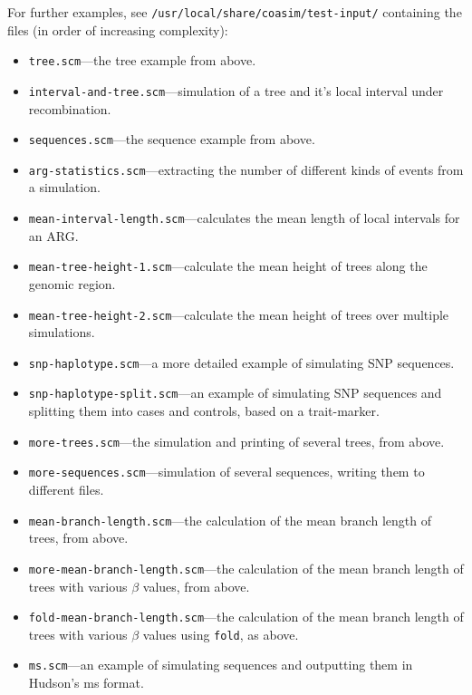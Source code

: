 \documentclass{manual}
\begin{document}
For further examples, see \verb?/usr/local/share/coasim/test-input/?
containing the files (in order of increasing complexity):
\begin{itemize}
\item \texttt{tree.scm}---the tree example from above.
\item \texttt{interval-and-tree.scm}---simulation of a tree and it's
  local interval under recombination.
\item \texttt{sequences.scm}---the sequence example from above.
\item \texttt{arg-statistics.scm}---extracting the number of different
  kinds of events from a simulation.
\item \texttt{mean-interval-length.scm}---calculates the mean length
  of local intervals for an ARG.
\item \texttt{mean-tree-height-1.scm}---calculate the mean height of
  trees along the genomic region.
\item \texttt{mean-tree-height-2.scm}---calculate the mean height of
  trees over multiple simulations.
\item \texttt{snp-haplotype.scm}---a more detailed example of
  simulating SNP sequences.
\item \texttt{snp-haplotype-split.scm}---an example of
  simulating SNP sequences and splitting them into cases and controls,
  based on a trait-marker.
\item \texttt{more-trees.scm}---the simulation and printing of several
  trees, from above.
\item \texttt{more-sequences.scm}---simulation of several sequences,
  writing them to different files.
\item \texttt{mean-branch-length.scm}---the calculation of the mean branch
  length of trees, from above.
\item \texttt{more-mean-branch-length.scm}---the calculation of the mean branch
  length of trees with various $\beta$ values, from above.
\item \texttt{fold-mean-branch-length.scm}---the calculation of the mean branch
  length of trees with various $\beta$ values using \texttt{fold}, as above.
\item \texttt{ms.scm}---an example of simulating sequences and
  outputting them in Hudson's ms format.
\end{itemize}
\end{document}
